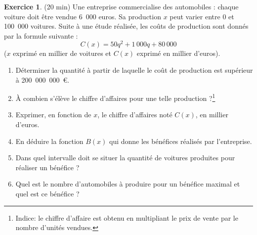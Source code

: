 \documentclass{exam}
\theoremstyle{definition}
\newtheorem{exercice}{Exercice}
\begin{document}
\begin{exercice}{(20 min)}
Une entreprise commercialise des automobiles : chaque voiture doit être vendue 6 000 euros. Sa production $x$ peut varier entre 0 et 100 000 voitures. Suite à une étude réalisée, les coûts de production sont donnés par la formule suivante :
\[
C(x) = 50q^2 + 1\,000q + 80\,000
\]
($x$ exprimé en millier de voitures et $C(x)$ exprimé en millier d’euros).


\begin{enumerate}
    \item Déterminer la quantité à partir de laquelle le coût de production est supérieur à 200 000 000 €.
    \item À combien s’élève le chiffre d’affaires pour une telle production ?\footnote{Indice: le chiffre d'affaire est obtenu en multipliant le prix de vente par le nombre d'unités vendues.}
    \item Exprimer, en fonction de $x$, le chiffre d’affaires noté $C(x)$, en millier d’euros.
    \item En déduire la fonction $B(x)$ qui donne les bénéfices réalisés par l’entreprise.
    \item Dans quel intervalle doit se situer la quantité de voitures produites pour réaliser un bénéfice ?
    \item Quel est le nombre d’automobiles à produire pour un bénéfice maximal et quel est ce bénéfice ?
\end{enumerate}
\end{exercice}    
\end{document}
